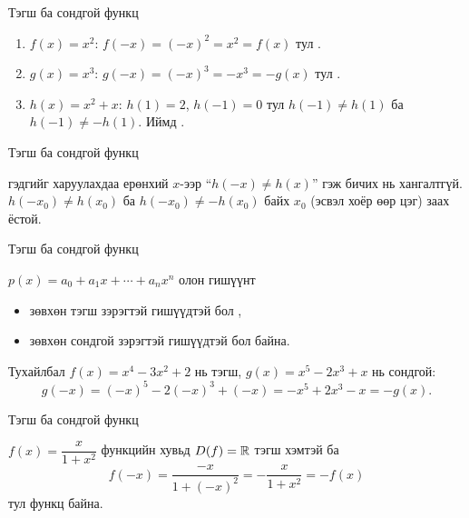 \begin{frame}[allowframebreaks]{Тэгш ба сондгой функц}
\begin{example}
\leavevmode
\begin{enumerate}
  \item $f(x)=x^2$: \; $f(-x)=(-x)^2=x^2=f(x)$ тул .
  \item $g(x)=x^3$: \; $g(-x)=(-x)^3=-x^3=-g(x)$ тул .
  \item $h(x)=x^2+x$: \; $h(1)=2$, $h(-1)=0$ тул $h(-1)\neq h(1)$ ба $h(-1)\neq -h(1)$.
        Иймд .
\end{enumerate}
\end{example}
\end{frame}

\begin{frame}[allowframebreaks]{Тэгш ба сондгой функц}
\begin{remark}
 гэдгийг харуулахдаа ерөнхий $x$-ээр
``$h(-x)\neq h(x)$'' гэж бичих нь хангалтгүй. $h(-x_0)\neq h(x_0)$ ба
$h(-x_0)\neq -h(x_0)$ байх  $x_0$ (эсвэл хоёр өөр цэг) заах ёстой.
\end{remark}
\end{frame}

\begin{frame}[allowframebreaks]{Тэгш ба сондгой функц}
\begin{example}
$p(x)=a_0+a_1x+\cdots+a_nx^n$ олон гишүүнт
\begin{itemize}
  \item зөвхөн тэгш зэрэгтэй гишүүдтэй бол ,
  \item зөвхөн сондгой зэрэгтэй гишүүдтэй бол  байна.
\end{itemize}
Тухайлбал $f(x)=x^4-3x^2+2$ нь тэгш, $g(x)=x^5-2x^3+x$ нь сондгой:
\[
g(-x)=(-x)^5-2(-x)^3+(-x)=-x^5+2x^3-x=-g(x).
\]
\end{example}
\end{frame}

\begin{frame}[allowframebreaks]{Тэгш ба сондгой функц}
\begin{example}
$f(x)=\dfrac{x}{1+x^2}$ функцийн хувьд $D(f)=\mathbb{R}$ тэгш хэмтэй ба
\[f(-x)=\frac{-x}{1+(-x)^2}=-\frac{x}{1+x^2}=-f(x)\]
тул  функц байна.
\end{example}
\end{frame}

